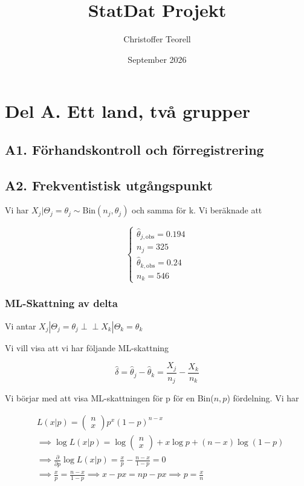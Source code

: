 \documentclass{article}
\title{StatDat Projekt}
\author{Christoffer Teorell}
\date{September 2026}
\newcommand{\indep}{\perp \!\!\! \perp}
\begin{document}
\maketitle

\section{Del A. Ett land, två grupper}

\subsection{A1. Förhandskontroll och förregistrering}

\subsection{A2. Frekventistisk utgångspunkt}

Vi har $X_j|\Theta_j=\theta_j \sim \text{Bin}(n_j,\theta_j)$ och samma för k. Vi beräknade att

\[
\begin{cases}
    \hat \theta_{j,\text{obs}}=0.194\\
    n_j = 325\\
    \hat \theta_{k,\text{obs}} = 0.24\\
    n_k = 546
\end{cases}
\]

\subsubsection{ML-Skattning av delta}

Vi antar $X_j|\Theta_j=\theta_j\indep X_k|\Theta_k=\theta_k$

Vi vill visa att vi har följande ML-skattning

\[
\hat \delta =\hat \theta_j-\hat \theta_{k}= \frac{X_j}{n_j}-\frac{X_k}{n_k}
\]

Vi börjar med att visa ML-skattningen för p för en Bin($n,p$) fördelning. Vi har

\[
\begin{aligned}
&L(x|p)=\begin{pmatrix}
    n\\x
\end{pmatrix}p^x(1-p)^{n-x}\\
&\implies \log L(x|p)=\log \begin{pmatrix}
    n\\x
\end{pmatrix}+x\log p +(n-x)\log (1-p)\\
&\implies \frac{\partial }{\partial p}\log L(x|p)=\frac{x}{p}-\frac{n-x}{1-p}=0\\
&\implies \frac{x}{p}=\frac{n-x}{1-p}\implies x-px=np-px \implies p=\frac{x}{n}
\end{aligned}
\]
\end{document}
